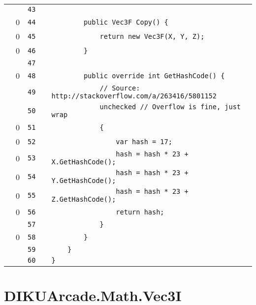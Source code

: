 \documentclass[a4paper,landscape,10pt]{article}
\begin{document}
\begin{longtable}[l]{lrrll}
\cellcolor{gray} &  & \verb~43~ & & \verb~~\\
\cellcolor{red} & 0 & \verb~44~ & & \verb~        public Vec3F Copy() {~\\
\cellcolor{red} & 0 & \verb~45~ & & \verb~            return new Vec3F(X, Y, Z);~\\
\cellcolor{red} & 0 & \verb~46~ & & \verb~        }~\\
\cellcolor{gray} &  & \verb~47~ & & \verb~~\\
\cellcolor{red} & 0 & \verb~48~ & & \verb~        public override int GetHashCode() {~\\
\cellcolor{gray} &  & \verb~49~ & & \verb~            // Source: http://stackoverflow.com/a/263416/5801152~\\
\cellcolor{gray} &  & \verb~50~ & & \verb~            unchecked // Overflow is fine, just wrap~\\
\cellcolor{red} & 0 & \verb~51~ & & \verb~            {~\\
\cellcolor{red} & 0 & \verb~52~ & & \verb~                var hash = 17;~\\
\cellcolor{red} & 0 & \verb~53~ & & \verb~                hash = hash * 23 + X.GetHashCode();~\\
\cellcolor{red} & 0 & \verb~54~ & & \verb~                hash = hash * 23 + Y.GetHashCode();~\\
\cellcolor{red} & 0 & \verb~55~ & & \verb~                hash = hash * 23 + Z.GetHashCode();~\\
\cellcolor{red} & 0 & \verb~56~ & & \verb~                return hash;~\\
\cellcolor{gray} &  & \verb~57~ & & \verb~            }~\\
\cellcolor{red} & 0 & \verb~58~ & & \verb~        }~\\
\cellcolor{gray} &  & \verb~59~ & & \verb~    }~\\
\cellcolor{gray} &  & \verb~60~ & & \verb~}~\\
\end{longtable}
\newpage
\section{DIKUArcade.Math.Vec3I}
\end{document}
